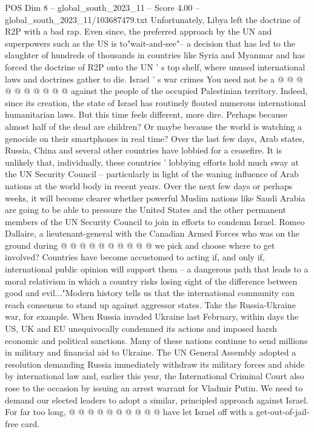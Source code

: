 \begin{textsample}{POS Dim 8 – global\_south\_2023\_11 – Score 4.00 – global\_south\_2023\_11/103687479.txt}
Unfortunately, Libya left the doctrine of R2P with a bad rap.
Even since, the preferred approach by the UN and superpowers such as the US is to"wait-and-see"-- a decision that has led to the slaughter of hundreds of thousands in countries like Syria and Myanmar and has forced the doctrine of R2P onto the UN ' s top shelf, where unused international laws and doctrines gather to die.
Israel ' s war crimes You need not be a @ @ @ @ @ @ @ @ @ @ against the people of the occupied Palestinian territory.
Indeed, since its creation, the state of Israel has routinely flouted numerous international humanitarian laws.
But this time feels different, more dire.
Perhaps because almost half of the dead are children?
Or maybe because the world is watching a genocide on their smartphones in real time?
Over the last few days, Arab states, Russia, China and several other countries have lobbied for a ceasefire.
It is unlikely that, individually, these countries ' lobbying efforts hold much sway at the UN Security Council -- particularly in light of the waning influence of Arab nations at the world body in recent years.
Over the next few days or perhaps weeks, it will become clearer whether powerful Muslim nations like Saudi Arabia are going to be able to pressure the United States and the other permanent members of the UN Security Council to join in efforts to condemn Israel.
Romeo Dallaire, a lieutenant-general with the Canadian Armed Forces who was on the ground during @ @ @ @ @ @ @ @ @ @ we pick and choose where to get involved?
Countries have become accustomed to acting if, and only if, international public opinion will support them -- a dangerous path that leads to a moral relativism in which a country risks losing sight of the difference between good and evil..."Modern history tells us that the international community can reach consensus to stand up against aggressor states.
Take the Russia-Ukraine war, for example.
When Russia invaded Ukraine last February, within days the US, UK and EU unequivocally condemned its actions and imposed harsh economic and political sanctions.
Many of these nations continue to send millions in military and financial aid to Ukraine.
The UN General Assembly adopted a resolution demanding Russia immediately withdraw its military forces and abide by international law and, earlier this year, the International Criminal Court also rose to the occasion by issuing an arrest warrant for Vladmir Putin.
We need to demand our elected leaders to adopt a similar, principled approach against Israel.
For far too long, @ @ @ @ @ @ @ @ @ @ have let Israel off with a get-out-of-jail-free card.

\end{textsample}
